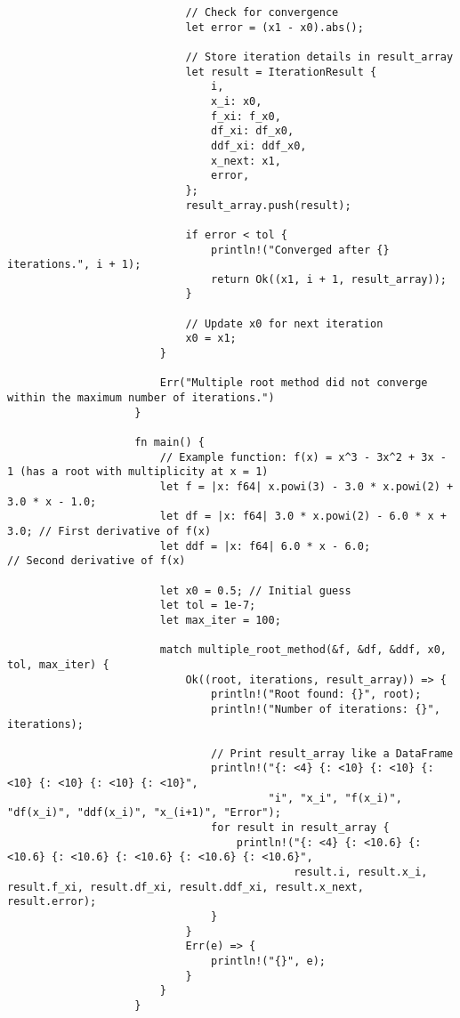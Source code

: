 \documentclass{article}
\begin{document}
\begin{verbatim}
                            // Check for convergence
                            let error = (x1 - x0).abs();

                            // Store iteration details in result_array
                            let result = IterationResult {
                                i,
                                x_i: x0,
                                f_xi: f_x0,
                                df_xi: df_x0,
                                ddf_xi: ddf_x0,
                                x_next: x1,
                                error,
                            };
                            result_array.push(result);

                            if error < tol {
                                println!("Converged after {} iterations.", i + 1);
                                return Ok((x1, i + 1, result_array));
                            }

                            // Update x0 for next iteration
                            x0 = x1;
                        }

                        Err("Multiple root method did not converge within the maximum number of iterations.")
                    }

                    fn main() {
                        // Example function: f(x) = x^3 - 3x^2 + 3x - 1 (has a root with multiplicity at x = 1)
                        let f = |x: f64| x.powi(3) - 3.0 * x.powi(2) + 3.0 * x - 1.0;
                        let df = |x: f64| 3.0 * x.powi(2) - 6.0 * x + 3.0; // First derivative of f(x)
                        let ddf = |x: f64| 6.0 * x - 6.0;                 // Second derivative of f(x)

                        let x0 = 0.5; // Initial guess
                        let tol = 1e-7;
                        let max_iter = 100;

                        match multiple_root_method(&f, &df, &ddf, x0, tol, max_iter) {
                            Ok((root, iterations, result_array)) => {
                                println!("Root found: {}", root);
                                println!("Number of iterations: {}", iterations);

                                // Print result_array like a DataFrame
                                println!("{: <4} {: <10} {: <10} {: <10} {: <10} {: <10} {: <10}",
                                         "i", "x_i", "f(x_i)", "df(x_i)", "ddf(x_i)", "x_(i+1)", "Error");
                                for result in result_array {
                                    println!("{: <4} {: <10.6} {: <10.6} {: <10.6} {: <10.6} {: <10.6} {: <10.6}",
                                             result.i, result.x_i, result.f_xi, result.df_xi, result.ddf_xi, result.x_next, result.error);
                                }
                            }
                            Err(e) => {
                                println!("{}", e);
                            }
                        }
                    }

                \end{verbatim}
\end{document}
